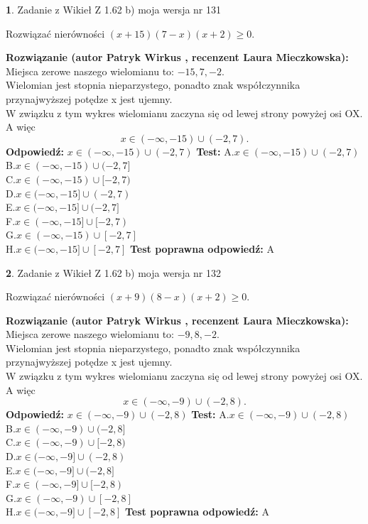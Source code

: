 \documentclass[12pt, a4paper]{article}
\theoremstyle{definition} %
\newtheorem{zad}{}
\newcommand{\zadStart}[1]{\begin{zad}#1\newline}
\newcommand{\zadStop}{\end{zad}}
\newcommand{\rozwStart}[2]{\noindent \textbf{Rozwiązanie (autor #1 , recenzent #2): }\newline}
\newcommand{\rozwStop}{\newline}
\newcommand{\odpStart}{\noindent \textbf{Odpowiedź:}\newline}
\newcommand{\odpStop}{\newline}
\newcommand{\testStart}{\noindent \textbf{Test:}\newline}
\newcommand{\testStop}{\newline}
\newcommand{\kluczStart}{\noindent \textbf{Test poprawna odpowiedź:}\newline}
\newcommand{\kluczStop}{\newline}
\begin{document}
\zadStart{Zadanie z Wikieł Z 1.62 b) moja wersja nr 131}

Rozwiązać nierówności $(x+15)(7-x)(x+2)\ge0$.
\zadStop
\rozwStart{Patryk Wirkus}{Laura Mieczkowska}
Miejsca zerowe naszego wielomianu to: $-15, 7, -2$.\\
Wielomian jest stopnia nieparzystego, ponadto znak współczynnika przy\linebreak najwyższej potędze x jest ujemny.\\ W związku z tym wykres wielomianu zaczyna się od lewej strony powyżej osi OX. A więc $$x \in (-\infty,-15) \cup (-2,7).$$
\rozwStop
\odpStart
$x \in (-\infty,-15) \cup (-2,7)$
\odpStop
\testStart
A.$x \in (-\infty,-15) \cup (-2,7)$\\
B.$x \in (-\infty,-15) \cup (-2,7]$\\
C.$x \in (-\infty,-15) \cup [-2,7)$\\
D.$x \in (-\infty,-15] \cup (-2,7)$\\
E.$x \in (-\infty,-15] \cup (-2,7]$\\
F.$x \in (-\infty,-15] \cup [-2,7)$\\
G.$x \in (-\infty,-15) \cup [-2,7]$\\
H.$x \in (-\infty,-15] \cup [-2,7]$
\testStop
\kluczStart
A
\kluczStop



\zadStart{Zadanie z Wikieł Z 1.62 b) moja wersja nr 132}

Rozwiązać nierówności $(x+9)(8-x)(x+2)\ge0$.
\zadStop
\rozwStart{Patryk Wirkus}{Laura Mieczkowska}
Miejsca zerowe naszego wielomianu to: $-9, 8, -2$.\\
Wielomian jest stopnia nieparzystego, ponadto znak współczynnika przy\linebreak najwyższej potędze x jest ujemny.\\ W związku z tym wykres wielomianu zaczyna się od lewej strony powyżej osi OX. A więc $$x \in (-\infty,-9) \cup (-2,8).$$
\rozwStop
\odpStart
$x \in (-\infty,-9) \cup (-2,8)$
\odpStop
\testStart
A.$x \in (-\infty,-9) \cup (-2,8)$\\
B.$x \in (-\infty,-9) \cup (-2,8]$\\
C.$x \in (-\infty,-9) \cup [-2,8)$\\
D.$x \in (-\infty,-9] \cup (-2,8)$\\
E.$x \in (-\infty,-9] \cup (-2,8]$\\
F.$x \in (-\infty,-9] \cup [-2,8)$\\
G.$x \in (-\infty,-9) \cup [-2,8]$\\
H.$x \in (-\infty,-9] \cup [-2,8]$
\testStop
\kluczStart
A
\kluczStop
\end{document}

